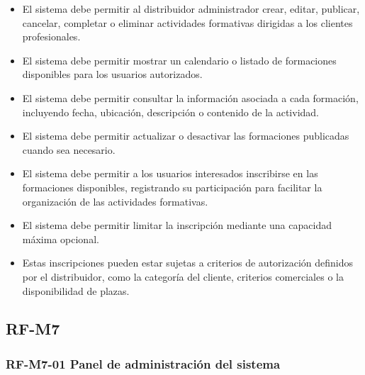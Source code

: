 \begin{itemize}
    \item El sistema debe permitir al distribuidor administrador crear, editar, publicar, cancelar, completar o eliminar actividades formativas dirigidas a los clientes profesionales.
    \item El sistema debe permitir mostrar un calendario o listado de formaciones disponibles para los usuarios autorizados.
    \item El sistema debe permitir consultar la información asociada a cada formación, incluyendo fecha, ubicación, descripción o contenido de la actividad.
    \item El sistema debe permitir actualizar o desactivar las formaciones publicadas cuando sea necesario.
    \item El sistema debe permitir a los usuarios interesados inscribirse en las formaciones disponibles, registrando su participación para facilitar la organización de las actividades formativas.
    \item El sistema debe permitir limitar la inscripción mediante una capacidad máxima opcional.
    \item Estas inscripciones pueden estar sujetas a criterios de autorización definidos por el distribuidor, como la categoría del cliente, criterios comerciales o la disponibilidad de plazas.
\end{itemize}

\subsection{RF-M7}

\vspace{-0.75em}
\subsubsection{RF-M7-01 Panel de administración del sistema}
\vspace{-1em}

